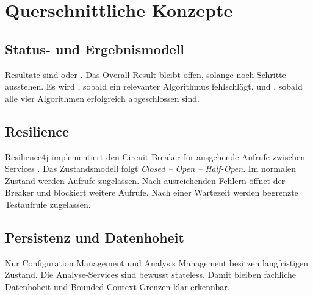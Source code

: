 \newpage

\section{Querschnittliche Konzepte}
\subsection{Status- und Ergebnismodell}

Resultate sind  oder . Das Overall Result bleibt offen, solange noch Schritte ausstehen. Es wird , sobald ein relevanter Algorithmus fehlschlägt, und , sobald alle vier Algorithmen erfolgreich abgeschlossen sind.

\vspace{1cm}
\begin{center}
\end{center}
\vspace{0.5cm}

\subsection{Resilience}
Resilience4j implementiert den Circuit Breaker für ausgehende Aufrufe zwischen Services \cite{richardson2018patterns}. Das Zustandsmodell folgt \emph{Closed -- Open -- Half-Open}. Im normalen Zustand werden Aufrufe zugelassen. Nach ausreichenden Fehlern öffnet der Breaker und blockiert weitere Aufrufe. Nach einer Wartezeit werden begrenzte Testaufrufe zugelassen.

\subsection{Persistenz und Datenhoheit}
Nur Configuration Management und Analysis Management besitzen langfristigen Zustand. Die Analyse-Services sind bewusst stateless. Damit bleiben fachliche Datenhoheit und Bounded-Context-Grenzen klar erkennbar.

